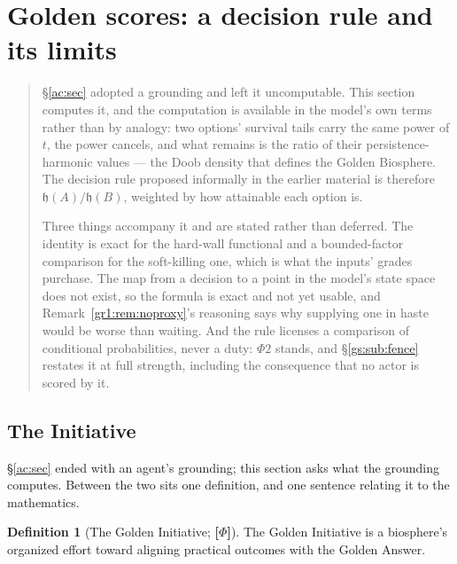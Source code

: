 \documentclass[11pt]{article}
\numberwithin{equation}{section}
\theoremstyle{plain}
\theoremstyle{definition}
\newtheorem{definition}[theorem]{Definition}
\theoremstyle{remark}
\newcommand{\hm}{\mathfrak{h}}
\begin{document}
\section{Golden scores: a decision rule and its limits}\label{gs:sec}

\begin{quote}\small
\S\ref{ac:sec} adopted a grounding and left it uncomputable. This section
computes it, and the computation is available in the model's own terms
rather than by analogy: two options' survival tails carry the same power
of $t$, the power cancels, and what remains is the ratio of their
persistence-harmonic values --- the Doob density that defines the Golden
Biosphere. The decision rule proposed informally in the earlier material
is therefore $\hm(A)/\hm(B)$, weighted by how attainable each option is.

Three things accompany it and are stated rather than deferred. The
identity is exact for the hard-wall functional and a bounded-factor
comparison for the soft-killing one, which is what the inputs' grades
purchase. The map from a decision to a point in the model's state space
does not exist, so the formula is exact and not yet usable, and
Remark~\ref{gr1:rem:noproxy}'s reasoning says why supplying one in haste would
be worse than waiting. And the rule licenses a comparison of conditional
probabilities, never a duty: $\Phi2$ stands, and \S\ref{gs:sub:fence}
restates it at full strength, including the consequence that no actor is
scored by it.
\end{quote}

\subsection{The Initiative}\label{gs:sub:initiative}

\S\ref{ac:sec} ended with an agent's grounding; this section asks what the grounding computes. Between the two sits one definition, and one sentence relating it to the mathematics.

\begin{definition}[The Golden Initiative; \textbf{[$\Phi$]}]\label{gs:def:initiative}
The Golden Initiative is a biosphere's organized effort toward aligning practical outcomes with the Golden Answer.
\end{definition}
\end{document}
